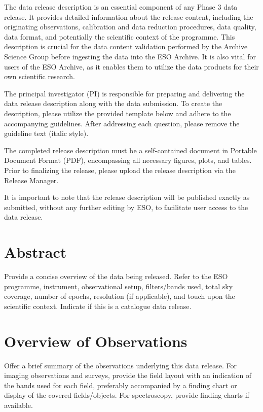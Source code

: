 \documentclass[a4paper,10pt]{book}
\begin{document}
The data release description is an essential component of any Phase 3 data release. It provides detailed information about the release content, including the originating observations, calibration and data reduction procedures, data quality, data format, and potentially the scientific context of the programme. This description is crucial for the data content validation performed by the Archive Science Group before ingesting the data into the ESO Archive. It is also vital for users of the ESO Archive, as it enables them to utilize the data products for their own scientific research.

The principal investigator (PI) is responsible for preparing and delivering the data release description along with the data submission. To create the description, please utilize the provided template below and adhere to the accompanying guidelines. After addressing each question, please remove the guideline text (italic style).

The completed release description must be a self-contained document in Portable Document Format (PDF), encompassing all necessary figures, plots, and tables. Prior to finalizing the release, please upload the release description via the Release Manager.

It is important to note that the release description will be published exactly as submitted, without any further editing by ESO, to facilitate user access to the data release.



\section{Abstract}

Provide a concise overview of the data being released. Refer to the ESO programme, instrument, observational setup, filters/bands used, total sky coverage, number of epochs, resolution (if applicable), and touch upon the scientific context. Indicate if this is a catalogue data release.

\section{Overview of Observations}

Offer a brief summary of the observations underlying this data release. For imaging observations and surveys, provide the field layout with an indication of the bands used for each field, preferably accompanied by a finding chart or display of the covered fields/objects. For spectroscopy, provide finding charts if available.
\end{document}
